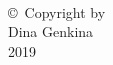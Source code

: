 
\thispagestyle{empty}
\hbox{\ }

\vfill
\renewcommand{\baselinestretch}{1}
\small\normalsize

\vspace{-.65in}

\begin{center}
\large{\copyright \hbox{ }Copyright by\\
Dina Genkina  %
\\
2019}
\end{center}

\vfill

\newpage

\hbox{\ }
\newpage
